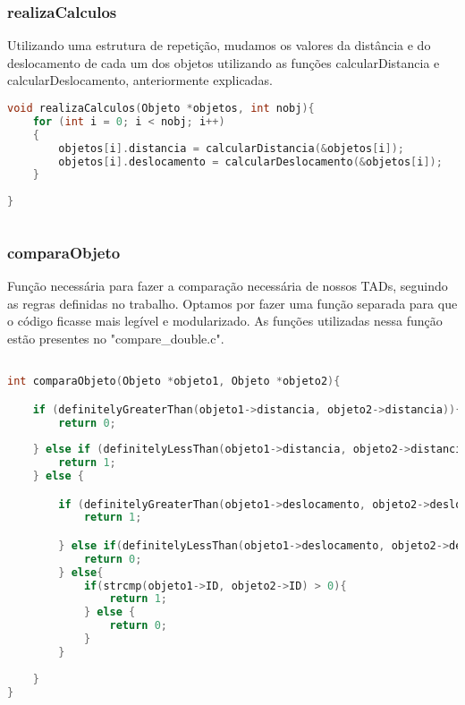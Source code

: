 \documentclass{article}
\begin{document}
\subsubsection{realizaCalculos}

Utilizando uma estrutura de repetição, mudamos os valores da distância e do deslocamento de cada um dos objetos utilizando as funções calcularDistancia e calcularDeslocamento, anteriormente explicadas.

\begin{lstlisting}[caption={Função realizaCalculos},label={lst:cod7},language=C]
void realizaCalculos(Objeto *objetos, int nobj){
    for (int i = 0; i < nobj; i++)
    {
        objetos[i].distancia = calcularDistancia(&objetos[i]);
        objetos[i].deslocamento = calcularDeslocamento(&objetos[i]);
    }
   
}
    
\end{lstlisting}

\subsubsection{comparaObjeto}

Função necessária para fazer a comparação necessária de nossos TADs, seguindo as regras
definidas no trabalho. Optamos por fazer uma função separada 
para que o código ficasse mais legível e modularizado. 
As funções utilizadas nessa função estão presentes no 
"compare\_double.c".

\begin{lstlisting}[caption={Função comparaObjetos},label={lst:cod7},language=C]

int comparaObjeto(Objeto *objeto1, Objeto *objeto2){

    if (definitelyGreaterThan(objeto1->distancia, objeto2->distancia)){
        return 0;
        
    } else if (definitelyLessThan(objeto1->distancia, objeto2->distancia)){
        return 1;
    } else {

        if (definitelyGreaterThan(objeto1->deslocamento, objeto2->deslocamento)) {
            return 1;

        } else if(definitelyLessThan(objeto1->deslocamento, objeto2->deslocamento)){
            return 0;
        } else{
            if(strcmp(objeto1->ID, objeto2->ID) > 0){
                return 1;
            } else {
                return 0;
            }
        }
        
    }
}
    
\end{lstlisting}
\end{document}
